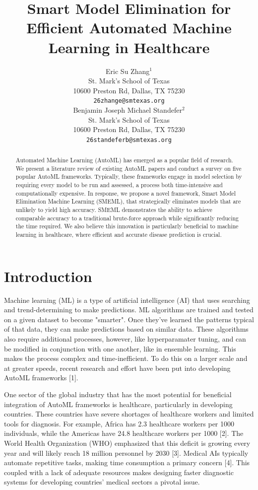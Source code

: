 \documentclass{article}
\title{Smart Model Elimination for Efficient Automated Machine Learning in Healthcare}
\author{%
  Eric Su Zhang$^1$ \\
  St. Mark's School of Texas\\
  10600 Preston Rd, Dallas, TX 75230\\
  \texttt{26zhange@smtexas.org} \\
  \And
  Benjamin Joseph Michael Standefer$^2$ \\
  St. Mark's School of Texas \\
  10600 Preston Rd, Dallas, TX 75230 \\
  \texttt{26standeferb@smtexas.org} \\
}
\begin{document}
\maketitle


\begin{abstract}
  Automated Machine Learning (AutoML) has emerged as a popular field of research. We present a literature review of existing AutoML papers and conduct a survey on five popular AutoML frameworks. Typically, these frameworks engage in model selection by requiring every model to be run and assessed, a process both time-intensive and computationally expensive. In response, we propose a novel framework, Smart Model Elimination Machine Learning (SMEML), that strategically eliminates models that are unlikely to yield high accuracy. SMEML demonstrates the ability to achieve comparable accuracy to a traditional brute-force approach while significantly reducing the time required. We also believe this innovation is particularly beneficial to machine learning in healthcare, where efficient and accurate disease prediction is crucial. 
\end{abstract}


\section{Introduction}

Machine learning (ML) is a type of artificial intelligence (AI) that uses searching and trend-determining to make predictions. ML algorithms are trained and tested on a given dataset to become "smarter". Once they've learned the patterns typical of that data, they can make predictions based on similar data. These algorithms also require additional processes, however, like hyperparamater tuning, and can be modified in conjunction with one another, like in ensemble learning. This makes the process complex and time-inefficient. To do this on a larger scale and at greater speeds, recent research and effort have been put into developing AutoML frameworks [1].

One sector of the global industry that has the most potential for beneficial integration of AutoML frameworks is healthcare, particularly in developing countries. These countries have severe shortages of healthcare workers and limited tools for diagnosis. For example, Africa has 2.3 healthcare workers per 1000 individuals, while the Americas have 24.8 healthcare workers per 1000 [2]. The World Health Organization (WHO) emphasized that this deficit is growing every year and will likely reach 18 million personnel by 2030 [3]. Medical AIs typically automate repetitive tasks, making time consumption a primary concern [4]. This coupled with a lack of adequate resources makes designing faster diagnostic systems for developing countries' medical sectors a pivotal issue. 
\end{document}
